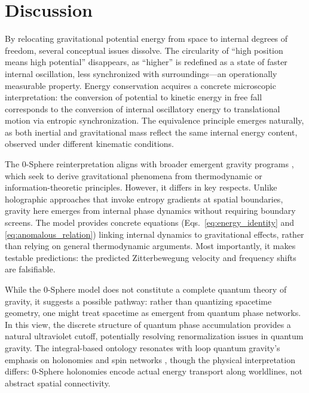 \documentclass[%
 reprint,
 amsmath,amssymb,
 aps,
 prb,
]{revtex4-2}
\numberwithin{equation}{section}
\begin{document}
\section{Discussion}
\label{sec:discussion}

By relocating gravitational potential energy from space to internal degrees of freedom, several conceptual issues dissolve. The circularity of ``high position means high potential'' disappears, as ``higher'' is redefined as a state of faster internal oscillation, less synchronized with surroundings---an operationally measurable property. Energy conservation acquires a concrete microscopic interpretation: the conversion of potential to kinetic energy in free fall corresponds to the conversion of internal oscillatory energy to translational motion via entropic synchronization. The equivalence principle emerges naturally, as both inertial and gravitational mass reflect the same internal energy content, observed under different kinematic conditions.

The 0-Sphere reinterpretation aligns with broader emergent gravity programs \cite{Verlinde2011,Jacobson1995}, which seek to derive gravitational phenomena from thermodynamic or information-theoretic principles. However, it differs in key respects. Unlike holographic approaches that invoke entropy gradients at spatial boundaries, gravity here emerges from internal phase dynamics without requiring boundary screens. The model provides concrete equations (Eqs.~\ref{eq:energy_identity} and \ref{eq:anomalous_relation}) linking internal dynamics to gravitational effects, rather than relying on general thermodynamic arguments. Most importantly, it makes testable predictions: the predicted Zitterbewegung velocity and frequency shifts are falsifiable.

While the 0-Sphere model does not constitute a complete quantum theory of gravity, it suggests a possible pathway: rather than quantizing spacetime geometry, one might treat spacetime as emergent from quantum phase networks. In this view, the discrete structure of quantum phase accumulation provides a natural ultraviolet cutoff, potentially resolving renormalization issues in quantum gravity. The integral-based ontology resonates with loop quantum gravity's emphasis on holonomies and spin networks \cite{Rovelli2004}, though the physical interpretation differs: 0-Sphere holonomies encode actual energy transport along worldlines, not abstract spatial connectivity.
\end{document}
